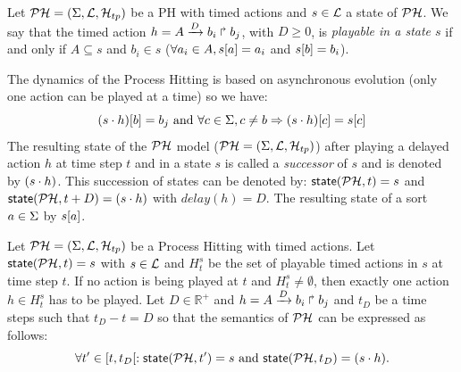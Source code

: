 \begin{definition} 
\label{def:playableAction}
Let $\mathcal{PH} = (\Sigma,\mathcal{L},\mathcal{H}_{tp})$ be a PH with timed actions and $s \in \mathcal{L}$ a state of $\mathcal{PH}$.
We say that the timed action $h = A\xrightarrow{D} b_i \Rsh b_j$, with $D \geq 0 $,
is \emph{playable in a state $s$} if and only if
$A \subseteq s$ and $b_i \in s$ (\ie$ \forall a_i \in A, {s[a]} = a_i$ and ${s[b]}=b_i$).
\end{definition}

%
The dynamics of the Process Hitting is based on asynchronous evolution (only one action can be played at a time) so we have: $${(s \cdot h)[b]} = b_j \text{ and } \forall c \in \Sigma, c \neq b \Rightarrow {(s \cdot h)[c]}={s[c]}$$
The resulting state of the $\mathcal{PH}$ model ($\mathcal{PH} = (\Sigma,\mathcal{L},\mathcal{H}_{tp})$) after playing a delayed action $h$ at time step $t$ and in a state $s$ is called a \emph{successor} of $s$ and is denoted by $(s \cdot h)$. This succession of states can be denoted by: $\textsf{state}(\mathcal{PH}, t)=s$ and $\textsf{state}(\mathcal{PH}, t+D)=(s \cdot h)$ with $delay(h)=D$. The resulting state of a sort $a \in \Sigma$ by ${s[a]}$. 

\begin{definition}
\label{def:semantic}
Let $\mathcal{PH} = (\Sigma,\mathcal{L},\mathcal{H}_{tp})$ be a Process Hitting with timed actions. Let $\textsf{state}(\mathcal{PH}, t)=s$ with $s \in \mathcal{L}$ and $H_t^s$ be the set of playable timed actions in $s$ at time step $t$. If no action is being played at $t$ and $H_t^s \not = \emptyset$, then exactly one action $h \in H_t^s$ has to be played. Let $D \in \mathds{R}^+$ and $h = A\xrightarrow{D} b_i \Rsh b_j$ and $t_D$ be a time steps such that $t_D - t = D$ so that the semantics of $\mathcal{PH}$ can be expressed as follows:
$$ \forall t' \in [t, t_D [ : \textsf{state}(\mathcal{PH}, t')=s \text{ and } \textsf{state}(\mathcal{PH}, t_D)=(s \cdot h).  $$
\end{definition}

